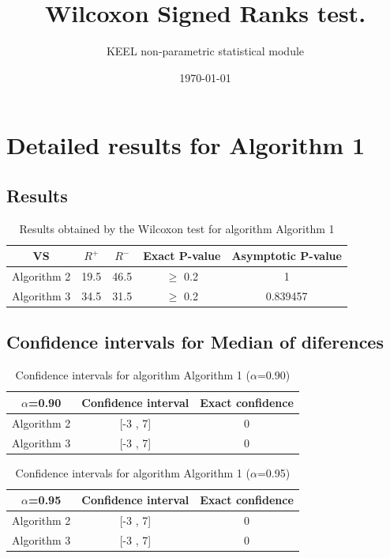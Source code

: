 \documentclass[a4paper,10pt]{article}
\title{Wilcoxon Signed Ranks test.}
\date{\today}
\author{KEEL non-parametric statistical module}
\begin{document}
\pagestyle{empty}
\maketitle
\thispagestyle{empty}



\section{Detailed results for Algorithm 1}


\subsection{Results}

\begin{table}[!htp]
\centering\small
\begin{tabular}{
|c|c|c|c|c|}
\hline
 VS & $R^{+}$ & $R^{-}$ & Exact P-value & Asymptotic P-value \\ \hline 
Algorithm 2 & 19.5 & 46.5 & $\geq$ 0.2 & 1\\ \hline 
Algorithm 3 & 34.5 & 31.5 & $\geq$ 0.2 & 0.839457\\ \hline 

\end{tabular}
\caption{Results obtained by the Wilcoxon test for algorithm Algorithm 1}
\end{table}

\subsection{Confidence intervals for Median of diferences}

\begin{table}[!htp]
\centering\small
\begin{tabular}{
|c|c|c|}
\hline
 $\alpha$=0.90 & Confidence interval & Exact confidence \\ \hline 
Algorithm 2 & [-3 , 7] & 0\\ \hline 
Algorithm 3 & [-3 , 7] & 0\\ \hline 

\end{tabular}
\caption{Confidence intervals for algorithm Algorithm 1 ($\alpha$=0.90)}
\end{table}
\begin{table}[!htp]
\centering\small
\begin{tabular}{
|c|c|c|}
\hline
 $\alpha$=0.95 & Confidence interval & Exact confidence \\ \hline 
Algorithm 2 & [-3 , 7] & 0\\ \hline 
Algorithm 3 & [-3 , 7] & 0\\ \hline 

\end{tabular}
\caption{Confidence intervals for algorithm Algorithm 1 ($\alpha$=0.95)}
\end{table}
\end{document}
